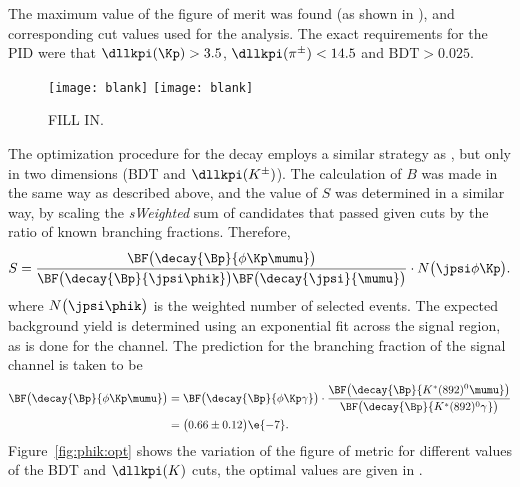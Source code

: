 The maximum value of the figure of merit
was found (as shown in ), and corresponding cut values used for the analysis.
The exact requirements for the PID were that $\dllkpi(\Kp)>3.5$, $\dllkpi(\pi^\pm)<14.5$ and
$\mathrm{BDT}>0.025$.

\begin{figure}
  \begin{center}
    \texttt{[image: blank]}
    \texttt{[image: blank]}
    \caption{\small
      FILL IN.
    }
    \label{fig:kpipi:opt}
  \end{center}
\end{figure}



The optimization procedure for the decay \btophikmumu employs a similar strategy as \btokpipimumu,
but only in two dimensions  (BDT and $\dllkpi(K^\pm)$).
The calculation of $B$ was made in the same way as described above, and the
value of $S$ was determined in a similar way, by scaling the \emph{sWeighted} sum of candidates
that passed given cuts by the ratio of known branching fractions.
Therefore,
\begin{equation}
  S =
  \frac{
    \BF\big(\decay{\Bp}{\phi\Kp\mumu}\big)
  }{
    \BF\big(\decay{\Bp}{\jpsi\phik}\big)
    \BF\big(\decay{\jpsi}{\mumu}\big)
  }
  \cdot
  N\big(\jpsi\phi\Kp\big).
\end{equation}
where $N\big(\jpsi\phik\big)$ is the weighted number of selected \btojpsiphik events.
The expected background yield is determined using an exponential fit across the signal region, as
is done for the \btokpipimumu channel.
The prediction for the branching fraction of the signal channel is taken to be
\begin{align}
  \BF\big(\decay{\Bp}{\phi\Kp\mumu}\big)
  &=
  \BF\big(\decay{\Bp}{\phi\Kp\gamma}\big)
  \cdot\frac{
    \BF\big(\decay{\Bp}{K^*(892)^0\mumu}\big)
  }{
    \BF\big(\decay{\Bp}{K^*(892)^0\gamma^{}}\big)
  }\nonumber\\
  &=\big(0.66\pm0.12\big)\e{-7}.
\end{align}
Figure~\ref{fig:phik:opt} shows the variation of the figure of metric for different values of the
BDT and $\dllkpi(K)$ cuts, the optimal values are given in .

